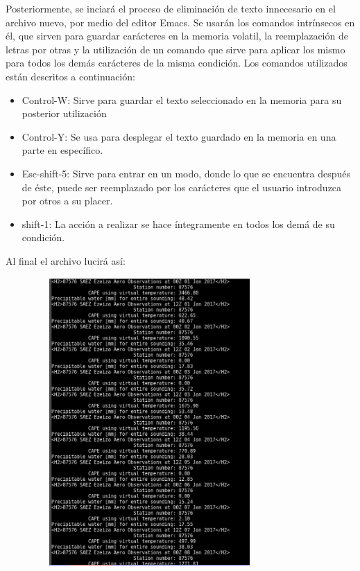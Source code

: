 \documentclass{article}
\begin{document}
Posteriormente, se inciará el proceso de eliminación de texto innecesario en el archivo nuevo, por medio del editor Emacs. Se usarán los comandos intrínsecos en él, que sirven para guardar carácteres en la memoria volatil, la reemplazación de letras por otras y la utilización de un comando que sirve para aplicar los mismo para todos los demás carácteres de la misma condición. Los comandos utilizados están descritos a continuación:

\begin{itemize}

\item Control-W: Sirve para guardar el texto seleccionado en la memoria para su posterior utilización

\item Control-Y: Se usa para desplegar el texto guardado en la memoria en una parte en específico.

\item Esc-shift-5: Sirve para entrar en un modo, donde lo que se encuentra después de éste, puede ser reemplazado por los carácteres que el usuario introduzca por otros a su placer.

\item shift-1: La acción a realizar se hace íntegramente en todos los demá de su condición.

\end{itemize}

Al final el archivo lucirá así:

\begin{center}
  \includegraphics[width=11cm, height=11cm]{CAPEPW.png}

\end{center}
\end{document}
